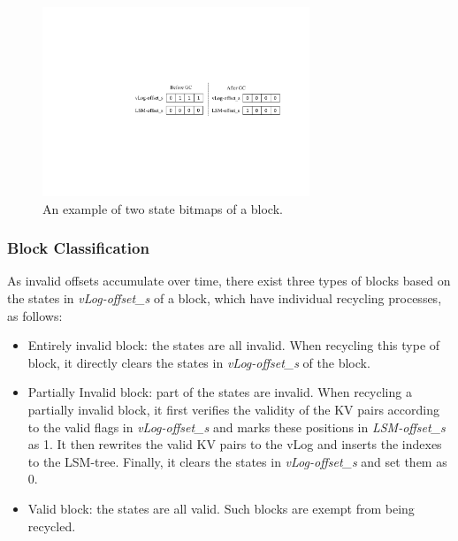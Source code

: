 \documentclass[sigconf]{acmart}
\begin{document}
\begin{figure}[!t]
	\setlength{\abovecaptionskip}{0.cm}	
	\setlength{\belowcaptionskip}{-0.cm}
	\centerline{\includegraphics[width=80mm]{bitmap.pdf}}
	\caption{An example of two state bitmaps of a block. {}}
	\label{fig:iblock}
\end{figure}

\subsubsection{Block Classification}
As invalid offsets accumulate over time, there exist three types of blocks based on the states in \textit{vLog-offset\_s} of a block, which have individual recycling processes, as follows: 
\begin{itemize}
	\item Entirely invalid block: the states are all invalid. When recycling this type of block, it directly clears the states in \textit{vLog-offset\_s} of the block.
	\item Partially Invalid block: part of the states are invalid. When recycling a partially invalid block, it first verifies the validity of the KV pairs according to the valid flags in \textit{vLog-offset\_s} and marks these positions in \textit{LSM-offset\_s} as 1. It then rewrites the valid KV pairs to the vLog and inserts the indexes to the LSM-tree. Finally, it clears the states in \textit{vLog-offset\_s} and set them as 0.
	\item Valid block: the states are all valid. Such blocks are exempt from being recycled.
\end{itemize}
\end{document}
